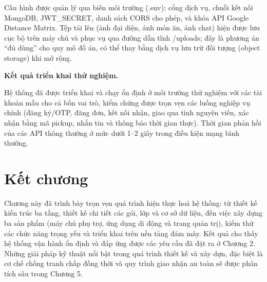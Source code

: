 \documentclass[../main.tex]{subfiles}%
\begin{document}
Cấu hình được quản lý qua biến môi trường (.env): cổng dịch vụ, chuỗi kết nối MongoDB, JWT\_SECRET, danh sách CORS cho phép, và khóa API Google Distance Matrix. Tệp tải lên (ảnh đại diện, ảnh món ăn, ảnh chat) hiện được lưu cục bộ trên máy chủ và phục vụ qua đường dẫn tĩnh /uploads; đây là phương án ``đủ dùng'' cho quy mô đồ án, có thể thay bằng dịch vụ lưu trữ đối tượng (object storage) khi mở rộng.

\textbf{Kết quả triển khai thử nghiệm.} 

Hệ thống đã được triển khai và chạy ổn định ở môi trường thử nghiệm với các tài khoản mẫu cho cả bốn vai trò, kiểm chứng được trọn vẹn các luồng nghiệp vụ chính (đăng ký/OTP, đăng đơn, kết nối nhận, giao qua tình nguyện viên, xác nhận bằng mã pickup, nhắn tin và thông báo thời gian thực). Thời gian phản hồi của các API thông thường ở mức dưới 1--2 giây trong điều kiện mạng bình thường.

\section{Kết chương}
Chương này đã trình bày trọn vẹn quá trình hiện thực hoá hệ thống: từ thiết kế kiến trúc ba tầng, thiết kế chi tiết các gói, lớp và cơ sở dữ liệu, đến việc xây dựng ba sản phẩm (máy chủ phụ trợ, ứng dụng di động và trang quản trị), kiểm thử các chức năng trọng yếu và triển khai trên nền tảng đám mây. Kết quả cho thấy hệ thống vận hành ổn định và đáp ứng được các yêu cầu đã đặt ra ở Chương 2. Những giải pháp kỹ thuật nổi bật trong quá trình thiết kế và xây dựn, đặc biệt là cơ chế chống tranh chấp đồng thời và quy trình giao nhận an toàn sẽ được phân tích sâu trong Chương 5.

\ifSubfilesClassLoaded{\printbibliography{}}{}
\end{document}
